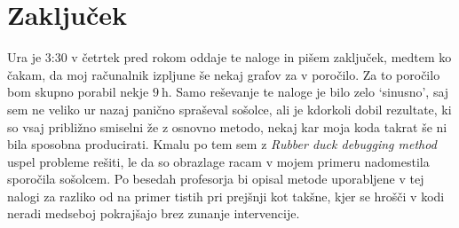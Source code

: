 \documentclass{porocilo}
\begin{document}



\section{Zaključek}
Ura je 3:30 v četrtek pred rokom oddaje te naloge in pišem zaključek, medtem ko čakam, da moj računalnik izpljune še nekaj grafov za v poročilo. Za to poročilo bom skupno porabil nekje $\SI{9}{\hour}$. Samo reševanje te naloge je bilo zelo `sinusno', saj sem ne veliko ur nazaj panično spraševal sošolce, ali je kdorkoli dobil rezultate, ki so vsaj približno smiselni že z osnovno metodo, nekaj kar moja koda takrat še ni bila sposobna producirati. Kmalu po tem sem z \textit{Rubber duck debugging method} uspel probleme rešiti, le da so obrazlage racam v mojem primeru nadomestila sporočila sošolcem. Po besedah profesorja bi opisal metode uporabljene v tej nalogi za razliko od na primer tistih pri prejšnji kot takšne, kjer se hrošči v kodi neradi medseboj pokrajšajo brez zunanje intervencije.
\end{document}
